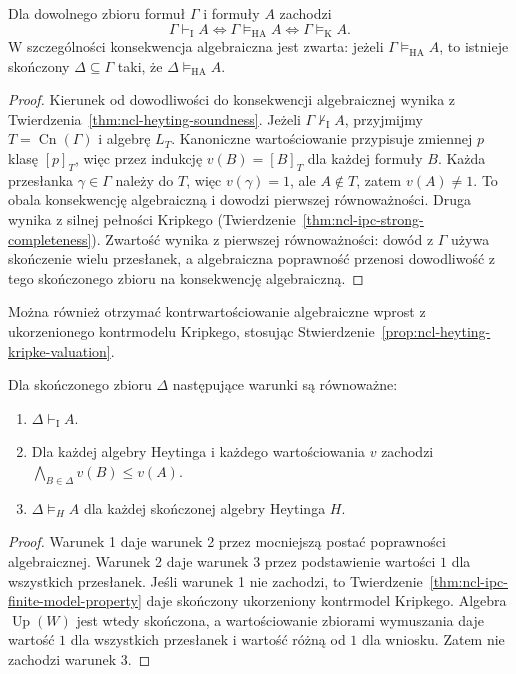 \begin{twierdzenie}
\label{thm:ncl-heyting-strong-completeness}
Dla dowolnego zbioru formuł $\Gamma$ i formuły $A$
zachodzi
\[
 \Gamma\vdash_{\mathrm I}A
 \iff \Gamma\models_{\mathrm{HA}}A
 \iff \Gamma\models_{\mathrm K}A.
\]
W szczególności konsekwencja algebraiczna jest
zwarta: jeżeli $\Gamma\models_{\mathrm{HA}}A$,
to istnieje skończony $\Delta\subseteq\Gamma$
taki, że $\Delta\models_{\mathrm{HA}}A$.
\end{twierdzenie}
\begin{proof}
Kierunek od dowodliwości do konsekwencji
algebraicznej wynika z
Twierdzenia~\ref{thm:ncl-heyting-soundness}.
Jeżeli $\Gamma\nvdash_{\mathrm I}A$, przyjmijmy
$T=\operatorname{Cn}(\Gamma)$ i algebrę $L_T$.
Kanoniczne wartościowanie przypisuje zmiennej
$p$ klasę $[p]_T$, więc przez indukcję
$v(B)=[B]_T$ dla każdej formuły $B$.
Każda przesłanka $\gamma\in\Gamma$ należy do $T$,
więc $v(\gamma)=1$, ale $A\notin T$,
zatem $v(A)\ne1$. To obala konsekwencję
algebraiczną i dowodzi pierwszej równoważności.
Druga wynika z silnej pełności Kripkego
(Twierdzenie~\ref{thm:ncl-ipc-strong-completeness}).
Zwartość wynika z pierwszej równoważności:
dowód z $\Gamma$ używa skończenie wielu przesłanek,
a algebraiczna poprawność przenosi dowodliwość
z tego skończonego zbioru na konsekwencję algebraiczną.
\end{proof}
Można również otrzymać kontrwartościowanie
algebraiczne wprost z ukorzenionego kontrmodelu
Kripkego, stosując
Stwierdzenie~\ref{prop:ncl-heyting-kripke-valuation}.

\begin{wniosek}
\label{cor:ncl-heyting-finite-consequence}
Dla skończonego zbioru $\Delta$ następujące
warunki są równoważne:
\begin{enumerate}
\item $\Delta\vdash_{\mathrm I}A$.
\item Dla każdej algebry Heytinga i każdego
      wartościowania $v$ zachodzi
      $\bigwedge_{B\in\Delta}v(B)\leq v(A)$.
\item $\Delta\models_H A$ dla każdej skończonej
      algebry Heytinga $H$.
\end{enumerate}
\end{wniosek}
\begin{proof}
Warunek 1 daje warunek 2 przez mocniejszą
postać poprawności algebraicznej.
Warunek 2 daje warunek 3 przez podstawienie
wartości $1$ dla wszystkich przesłanek.
Jeśli warunek 1 nie zachodzi, to
Twierdzenie~\ref{thm:ncl-ipc-finite-model-property}
daje skończony ukorzeniony kontrmodel Kripkego.
Algebra $\operatorname{Up}(W)$ jest wtedy skończona,
a wartościowanie zbiorami wymuszania daje wartość
$1$ dla wszystkich przesłanek i wartość różną
od $1$ dla wniosku. Zatem nie zachodzi warunek 3.
\end{proof}

